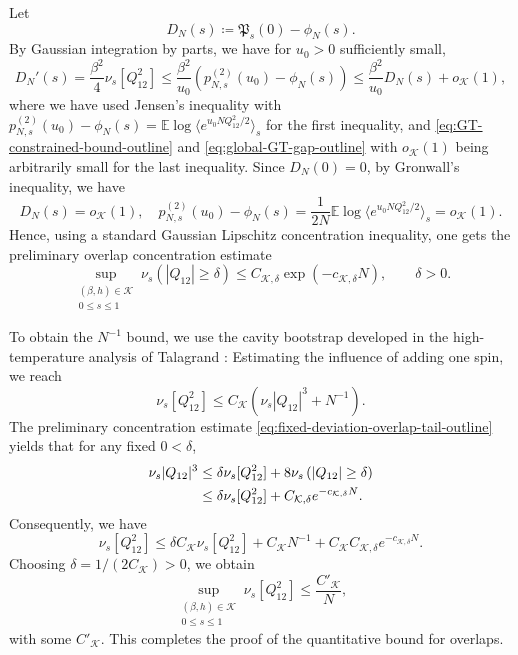 \documentclass[11pt]{article}
\numberwithin{equation}{section}
\newcommand{\1}{\mathbf 1}
\newcommand{\cK}{\mathcal K}
\begin{document}
Let \begin{equation*}
 D_N(s)\coloneqq \mathfrak P_s(0)-\phi_N(s).
\end{equation*} 
By Gaussian integration by parts, we have for $u_0>0$ sufficiently small,  
\[
D_N'(s) =  \frac{\beta^2}{4} \nu_s [Q_{12}^2]  \leq \frac{\beta^2}{u_0} ({p_{N,s}^{(2)}(u_0)-\phi_N(s)}) \leq   \frac{\beta^2}{u_0} D_N(s) +  o_\cK(1),
\]
where we have used Jensen's inequality with $p_{N,s}^{(2)}(u_0)-\phi_N(s)= \mathbb E\log \langle e^{u_0 N Q_{12}^2/2} \rangle_s$ for the first inequality, and \eqref{eq:GT-constrained-bound-outline} and \eqref{eq:global-GT-gap-outline} with $o_\cK(1)$ being arbitrarily small for the last inequality.  Since $D_N(0) = 0$, by Gronwall's inequality, we have
$$D_N(s) = o_\cK(1),\quad  p_{N,s}^{(2)}(u_0)-\phi_N(s)= \frac{1}{2N}\mathbb E\log \langle e^{u_0 N Q_{12}^2/2} \rangle_s = o_\cK(1).$$ 
Hence, using a standard Gaussian Lipschitz concentration inequality, one gets the preliminary
overlap concentration estimate
\begin{equation}
\sup_{\substack{(\beta,h)\in\mathcal K\\ 0\le s\le 1}}
\nu_s\left(
|Q_{12}|\ge\delta
\right)
\le
C_{\mathcal K,\delta}
\exp(-c_{\mathcal K,\delta}N),
\qquad \delta>0.
\label{eq:fixed-deviation-overlap-tail-outline}
\end{equation}

To obtain the $N^{-1}$ bound, we use
the cavity bootstrap developed in the high-temperature analysis of
Talagrand \cite[Chapter~1]{Talagrand}: Estimating the influence of adding one spin, we reach
\begin{equation}
\nu_s[Q_{12}^2] \leq C_\cK 
 \left(
\nu_s|Q_{12}|^3+N^{-1}
\right).
\label{eq:cavity-remainder-outline}
\end{equation}
The preliminary concentration estimate \eqref{eq:fixed-deviation-overlap-tail-outline} yields that for any fixed
$0<\delta$,
\begin{align}
\nu_s|Q_{12}|^3
&\le
\delta\nu_s[Q_{12}^2]
+
8\nu_s\left(|Q_{12}|\ge\delta\right)
\notag\\
&\le
\delta \nu_s[Q_{12}^2]+
C_{\mathcal K,\delta}e^{-c_{\mathcal K,\delta}N}.
\label{eq:cubic-bootstrap-outline}
\end{align}
Consequently, we have
\[
\nu_s[Q_{12}^2] \leq \delta C_\cK \nu_s[Q_{12}^2] +  C_\cK N^{-1} + C_\cK C_{\cK,\delta}e^{-c_{\mathcal K,\delta}N}.
\]
Choosing $\delta=1/(2C_\cK)>0$, we obtain
\begin{equation}
\sup_{\substack{(\beta,h)\in\mathcal K\\ 0\le s\le 1}}
\nu_s[Q_{12}^2]
\le
\frac{C'_{\mathcal K}}{N},
\label{eq:optimal-overlap-bound-outline}
\end{equation}
with some $C'_\cK$. This completes the proof of the quantitative bound for overlaps.
\end{document}
